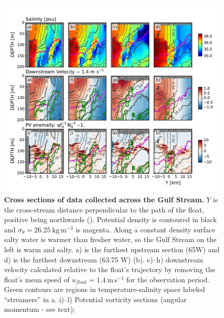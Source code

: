 \documentclass{natureJMK}
\begin{document}
\begin{figure}[htbp]
  \centering
    \includegraphics[width=\textwidth]{./SalDFirstStreamer.pdf}
    \caption{{\bf Cross sections of data collected across the Gulf Stream.}   $Y$ is the cross-stream distance perpendicular to the path of the float, positive being northwards (). Potential density is contoured in black and $\sigma_{\theta}=26.25\ \mathrm{kg\,m^{-3}}$ is magenta.  Along a constant density surface salty water is warmer than fresher water, so the Gulf Stream on the left is warm and salty.  a) is the furthest upstream section (65W) and d) is the furthest downstream (63.75 W) (b).  e)--h) downstream velocity calculated relative to the float's trajectory by removing the float's mean speed of $u_{float}=1.4\ \mathrm{m\,s^{-1}}$ for the observation period.   Green contours are regions in temperature-salinity space labeled ``streamers'' in a.  i)--l) Potential vorticity sections (angular momentum - see text); 
 } \label{fig:SalDFirstStreamer}
\end{figure}
\end{document}
